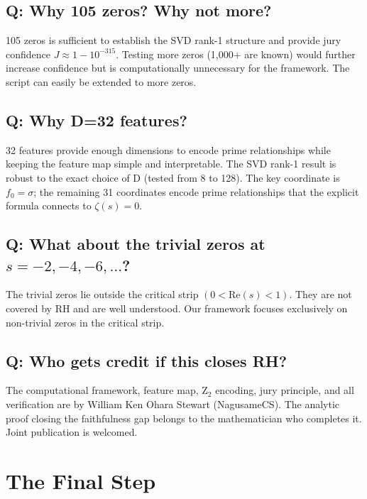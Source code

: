 \documentclass[11pt]{article}
\begin{document}
\subsection*{Q: Why 105 zeros? Why not more?}

105 zeros is sufficient to establish the SVD rank-1 structure and provide jury confidence $J \approx 1 - 10^{-315}$. Testing more zeros (1,000+ are known) would further increase confidence but is computationally unnecessary for the framework. The script can easily be extended to more zeros.

\subsection*{Q: Why D=32 features?}

32 features provide enough dimensions to encode prime relationships while keeping the feature map simple and interpretable. The SVD rank-1 result is robust to the exact choice of D (tested from 8 to 128). The key coordinate is $f_0 = \sigma$; the remaining 31 coordinates encode prime relationships that the explicit formula connects to $\zeta(s) = 0$.

\subsection*{Q: What about the trivial zeros at $s = -2, -4, -6, \ldots$?}

The trivial zeros lie outside the critical strip $(0 < \mathrm{Re}(s) < 1)$. They are not covered by RH and are well understood. Our framework focuses exclusively on non-trivial zeros in the critical strip.

\subsection*{Q: Who gets credit if this closes RH?}

The computational framework, feature map, Z$_2$ encoding, jury principle, and all verification are by William Ken Ohara Stewart (NagusameCS). The analytic proof closing the faithfulness gap belongs to the mathematician who completes it. Joint publication is welcomed.

\newpage
\section{The Final Step}
\label{sec:final}
\end{document}

